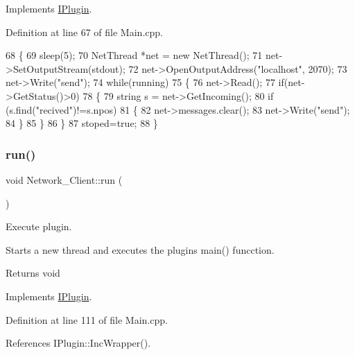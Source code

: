 Implements \hyperlink{class_i_plugin_ab5fdb3b0f7afdcee04324dca01766749}{I\+Plugin}.



Definition at line 67 of file Main.\+cpp.


\begin{DoxyCode}
68 \{
69     sleep(5);
70     NetThread *net = \textcolor{keyword}{new}  NetThread();
71     net->SetOutputStream(stdout);
72     net->OpenOutputAddress(\textcolor{stringliteral}{"localhost"}, 2070);
73     net->Write(\textcolor{stringliteral}{"send"});
74     \textcolor{keywordflow}{while}(running)
75     \{
76         net->Read();
77         \textcolor{keywordflow}{if}(net->GetStatus()>0)
78         \{
79             \textcolor{keywordtype}{string} s = net->GetIncoming();
80             \textcolor{keywordflow}{if} (s.find(\textcolor{stringliteral}{"recived"})!=s.npos)
81             \{
82                 net->messages.clear();
83                 net->Write(\textcolor{stringliteral}{"send"});
84             \}
85         \}
86     \}
87     stoped=\textcolor{keyword}{true};
88 \}
\end{DoxyCode}
\mbox{\label{class_network___client_a8831a63a0892de0f975e61b3d68473c7}} 
\subsubsection{\texorpdfstring{run()}{run()}}
{\footnotesize\ttfamily void Network\+\_\+\+Client\+::run (\begin{DoxyParamCaption}{ }\end{DoxyParamCaption})\hspace{0.3cm}{\ttfamily [virtual]}}



Execute plugin. 

Starts a new thread and executes the plugins main() funcction. \begin{DoxyReturn}{Returns}
void 
\end{DoxyReturn}


Implements \hyperlink{class_i_plugin_a46b4ace767e77f9db9c9585e99c09039}{I\+Plugin}.



Definition at line 111 of file Main.\+cpp.



References I\+Plugin\+::\+Inc\+Wrapper().


